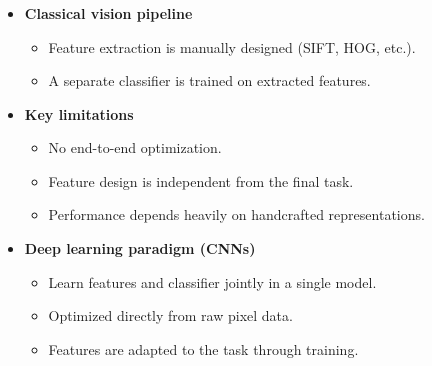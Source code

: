 \documentclass[xcolor=table]{beamer}
\begin{document}
\begin{frame}
	\frametitle{\insertshortsubtitle}
	\framesubtitle{\insertsection}
	
	\begin{itemize}
		
		\item \textbf{Classical vision pipeline}
		\begin{itemize}
			\item Feature extraction is manually designed (SIFT, HOG, etc.).
			\item A separate classifier is trained on extracted features.
		\end{itemize}
		
		\item \textbf{Key limitations}
		\begin{itemize}
			\item No end-to-end optimization.
			\item Feature design is independent from the final task.
			\item Performance depends heavily on handcrafted representations.
		\end{itemize}
		
		\item \textbf{Deep learning paradigm (CNNs)}
		\begin{itemize}
			\item Learn features and classifier jointly in a single model.
			\item Optimized directly from raw pixel data.
			\item Features are adapted to the task through training.
		\end{itemize}
		
	\end{itemize}
	
\end{frame}
\end{document}
